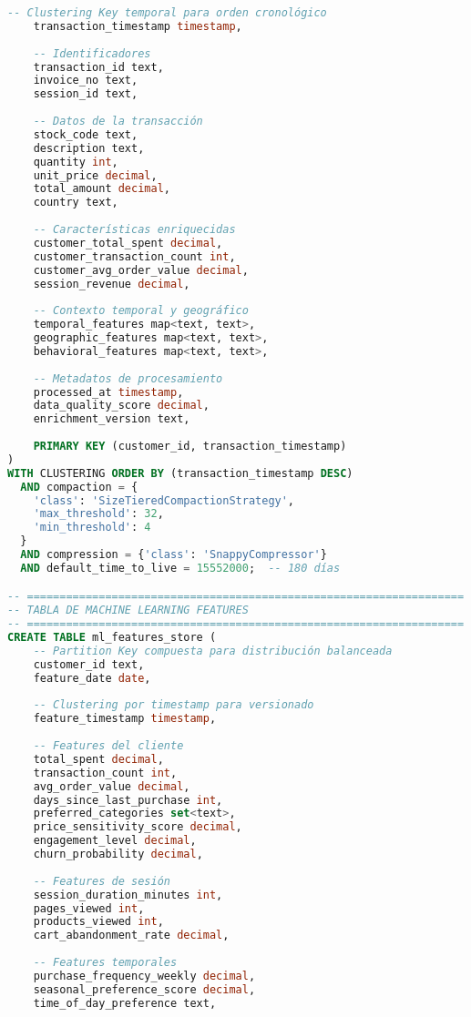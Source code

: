 \begin{lstlisting}[language=sql, caption=Definición del Keyspace y Tabla Principal de Analytics, label=lst:cassandra_schema]
    -- Clustering Key temporal para orden cronológico
    transaction_timestamp timestamp,
    
    -- Identificadores
    transaction_id text,
    invoice_no text,
    session_id text,
    
    -- Datos de la transacción
    stock_code text,
    description text,
    quantity int,
    unit_price decimal,
    total_amount decimal,
    country text,
    
    -- Características enriquecidas
    customer_total_spent decimal,
    customer_transaction_count int,
    customer_avg_order_value decimal,
    session_revenue decimal,
    
    -- Contexto temporal y geográfico
    temporal_features map<text, text>,
    geographic_features map<text, text>,
    behavioral_features map<text, text>,
    
    -- Metadatos de procesamiento
    processed_at timestamp,
    data_quality_score decimal,
    enrichment_version text,
    
    PRIMARY KEY (customer_id, transaction_timestamp)
) 
WITH CLUSTERING ORDER BY (transaction_timestamp DESC)
  AND compaction = {
    'class': 'SizeTieredCompactionStrategy',
    'max_threshold': 32,
    'min_threshold': 4
  }
  AND compression = {'class': 'SnappyCompressor'}
  AND default_time_to_live = 15552000;  -- 180 días

-- ===================================================================
-- TABLA DE MACHINE LEARNING FEATURES
-- ===================================================================
CREATE TABLE ml_features_store (
    -- Partition Key compuesta para distribución balanceada
    customer_id text,
    feature_date date,
    
    -- Clustering por timestamp para versionado
    feature_timestamp timestamp,
    
    -- Features del cliente
    total_spent decimal,
    transaction_count int,
    avg_order_value decimal,
    days_since_last_purchase int,
    preferred_categories set<text>,
    price_sensitivity_score decimal,
    engagement_level decimal,
    churn_probability decimal,
    
    -- Features de sesión
    session_duration_minutes int,
    pages_viewed int,
    products_viewed int,
    cart_abandonment_rate decimal,
    
    -- Features temporales
    purchase_frequency_weekly decimal,
    seasonal_preference_score decimal,
    time_of_day_preference text,
    

\end{lstlisting}
